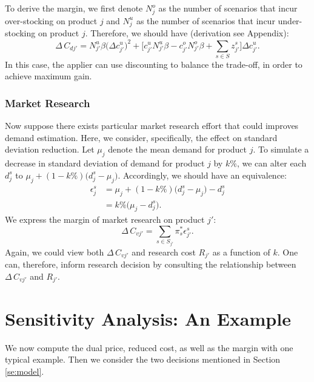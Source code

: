 \documentclass[a4paper,11pt]{article}
\begin{document}
To derive the margin, we first denote $N_j^o$ as the number of scenarios that incur over-stocking on product $j$ and $N_j^u$ as the number of scenarios that incur under-stocking on product $j$. Therefore, we should have (derivation see Appendix):
\[
    \Delta \, C_{dj'} = N_{j'}^u \beta \big( \Delta c_{j'}^u \big)^2 + \big[ c_{j'}^u N_{j'}^u \beta - c_{j'}^o N_{j'}^o \beta + \sum_{s \in S} z_{j'}^s \big] \Delta c_{j'}^u.
\]
In this case, the applier can use discounting to balance the trade-off, in order to achieve maximum gain. 
\subsubsection{Market Research}
Now suppose there exists particular market research effort that could improves demand estimation. Here, we consider, specifically, the effect on standard deviation reduction. Let $\mu_j$ denote the mean demand for product $j$. To simulate a decrease in standard deviation of demand for product $j$ by $k\%$, we can alter each $d_j^s$ to $\mu_j + (1-k\%) \big( d_j^s - \mu_j \big)$. Accordingly, we should have an equivalence:
\[
\begin{aligned}
    \epsilon_j^s 
    & = \mu_j + (1-k\%) \big( d_j^s - \mu_j \big) - d_j^s\\
    & = k\% \big( \mu_j - d_j^s \big).
\end{aligned}
\]
We express the margin of market research on product $j'$:
\[
    \Delta \, C_{vj'} = \sum_{s \in S_{j'}} \pi_s^* \epsilon_{j'}^s.
\]
Again, we could view both $\Delta \, C_{vj'}$ and research cost $R_{j'}$ as a function of $k$. One can, therefore, inform research decision by consulting the relationship between $\Delta \, C_{vj'}$ and $R_{j'}$.

\section{Sensitivity Analysis: An Example}
\label{se:sensitivity}

We now compute the dual price, reduced cost, as well as the margin with one typical example. Then we consider the two decisions mentioned in Section \ref{se:model}.

\begin{table}[ht]
\caption{Demand Realisations: Example}
\label{tab:demand}
\centering
{}
\end{table}
\end{document}
